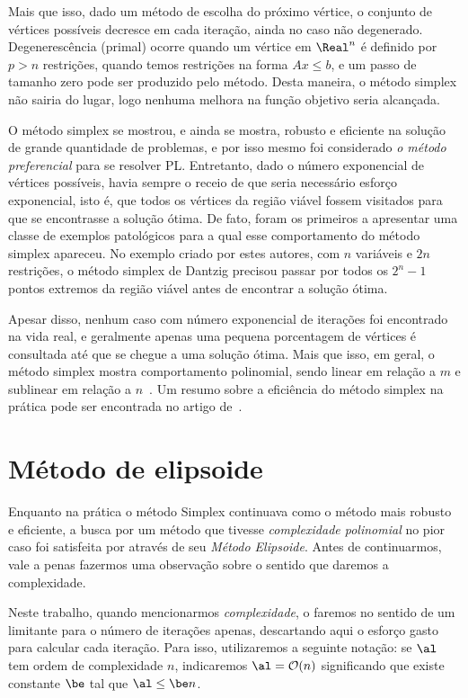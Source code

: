 Mais que isso, dado um método de escolha do próximo vértice, o conjunto de
vértices possíveis decresce em cada iteração,  ainda no caso não degenerado.
Degenerescência (primal) ocorre quando um vértice em $\Real^n$ é definido por
$p>n$ restrições, quando temos restrições na forma $Ax\leq b$, e um passo de tamanho zero pode ser produzido pelo método. Desta
maneira, o método simplex não sairia do lugar, logo nenhuma melhora na função
objetivo seria alcançada. 


O método simplex se mostrou, e ainda se mostra, robusto e eficiente na solução de grande
quantidade de problemas, e por isso mesmo foi considerado \emph{o método
preferencial} para se resolver \ac{PL}. Entretanto, dado o número exponencial
de  vértices possíveis, havia sempre o receio de que seria necessário esforço
exponencial, isto é, que   todos os vértices da região viável fossem
visitados para que se encontrasse a solução ótima. De fato, \textcite{Klee:1972wi}
foram os primeiros a apresentar uma classe de exemplos patológicos para a qual esse
comportamento  do método simplex apareceu. No exemplo criado por estes
autores, com $n$ variáveis e $2n$ restrições, o método simplex de Dantzig 
precisou passar por todos os $2^n-1$ pontos extremos da região viável antes de
encontrar a solução ótima. 


Apesar disso, nenhum caso com número exponencial de iterações foi encontrado na
vida real, e geralmente apenas uma pequena porcentagem de vértices é
consultada até que se chegue a uma solução ótima. Mais que isso, em geral, o método
simplex mostra comportamento polinomial, sendo linear em relação a $m$ e
sublinear em relação a $n$~\cite[pg.~94]{Fang:1993wu}. Um resumo sobre a
eficiência do método simplex na prática pode ser encontrada no artigo
de~\textcite{Shamir:1987th}.
 

\section{Método de elipsoide}

Enquanto na prática o método Simplex continuava como o método mais robusto e
eficiente, a busca por um método que tivesse \emph{complexidade polinomial} no pior
caso foi satisfeita por \textcite{Khachiyan:A-polynomial-algorithm:1979y} através
de seu  \emph{Método Elipsoide}. Antes de continuarmos, vale a penas fazermos uma observação sobre o sentido que daremos a complexidade.

\begin{obs}
Neste trabalho, quando mencionarmos \emph{complexidade}, o faremos no sentido de um limitante para o número de iterações apenas, descartando aqui o esforço gasto para calcular cada iteração.
Para isso, utilizaremos a seguinte notação: se $\al$ tem ordem de complexidade $n$, indicaremos $\al = \Oset(n)$ significando que  existe constante $\be$ tal que $\al \leq \be n$.
\end{obs}

